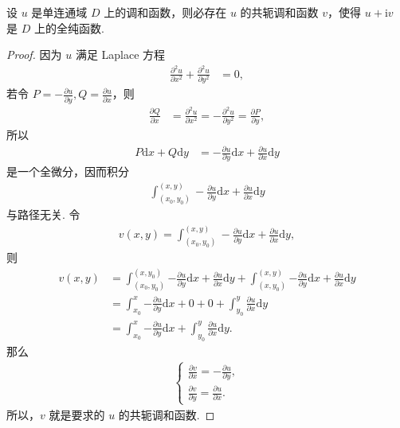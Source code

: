 \documentclass[../../main.tex]{subfiles}
\begin{document}
\begin{theorem}
设 $u$ 是单连通域 $D$ 上的调和函数，则必存在 $u$ 的共轭调和函数 $v$，使得 $u + \mathrm{i}v$ 是 $D$ 上的全纯函数.
\end{theorem}
\begin{proof}
因为 $u$ 满足 Laplace 方程
\begin{align*}
\frac{\partial^2 u}{\partial x^2} + \frac{\partial^2 u}{\partial y^2} &= 0,
\end{align*}
若令 $P = -\frac{\partial u}{\partial y}, Q = \frac{\partial u}{\partial x}$，则
\begin{align*}
\frac{\partial Q}{\partial x} &= \frac{\partial^2 u}{\partial x^2} = -\frac{\partial^2 u}{\partial y^2} = \frac{\partial P}{\partial y},
\end{align*}
所以
\begin{align*}
P \mathrm{d}x + Q \mathrm{d}y &= -\frac{\partial u}{\partial y} \mathrm{d}x + \frac{\partial u}{\partial x} \mathrm{d}y
\end{align*}
是一个全微分，因而积分
\begin{align*}
\int_{(x_0, y_0)}^{(x, y)} -\frac{\partial u}{\partial y} \mathrm{d}x + \frac{\partial u}{\partial x} \mathrm{d}y
\end{align*}
与路径无关. 令
\begin{align*}
v(x, y) = \int_{(x_0, y_0)}^{(x, y)} -\frac{\partial u}{\partial y} \mathrm{d}x + \frac{\partial u}{\partial x} \mathrm{d}y,
\end{align*}
则
\begin{align*}
v(x,y)&=\int_{(x_0,y_0)}^{(x,y_0)}{-\frac{\partial u}{\partial y}\mathrm{d}x+\frac{\partial u}{\partial x}\mathrm{d}y}+\int_{(x,y_0)}^{(x,y)}{-\frac{\partial u}{\partial y}\mathrm{d}x+\frac{\partial u}{\partial x}\mathrm{d}y}
\\
&=\int_{x_0}^x{-\frac{\partial u}{\partial y}\mathrm{d}x}+0+0+\int_{y_0}^y{\frac{\partial u}{\partial x}\mathrm{d}y}
\\
&=\int_{x_0}^x{-\frac{\partial u}{\partial y}\mathrm{d}x}+\int_{y_0}^y{\frac{\partial u}{\partial x}\mathrm{d}y}.
\end{align*}
那么
\begin{align*}
\begin{cases} 
\displaystyle \frac{\partial v}{\partial x} = -\frac{\partial u}{\partial y}, \\
\displaystyle \frac{\partial v}{\partial y} = \frac{\partial u}{\partial x}.
\end{cases}
\end{align*}
所以，$v$ 就是要求的 $u$ 的共轭调和函数.

\end{proof}
\end{document}
